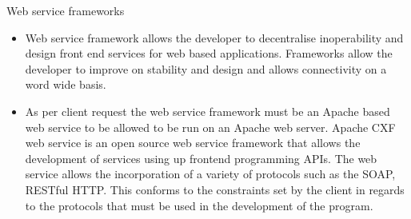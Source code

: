 \documentclass[12pt]{article}
\begin{document}
							 Web service frameworks
							\begin{itemize}
							\item Web service framework allows the developer to decentralise inoperability and design front end services for web based applications. Frameworks allow the developer to improve on stability and design and allows connectivity on a word wide basis.
							\item As per client request the web service framework must be an Apache based web service to be allowed to be run on an Apache web server. Apache CXF web service is an open source web service framework that allows the development of services using up frontend programming APIs. The web service allows the incorporation of a variety of protocols such as the SOAP, RESTful HTTP. This conforms to the constraints set by the client in regards to the protocols that must be used in the development of the program.
							
							\end{itemize}
					\vspace{0.2in}	
			
		
\end{document}
